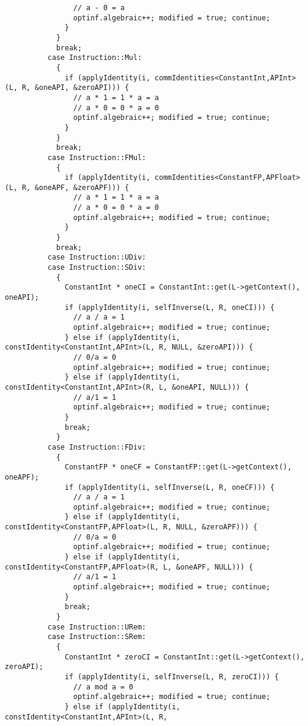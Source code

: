 \documentclass[12pt]{article}
\begin{document}
\begin{verbatim}
                // a - 0 = a
                optinf.algebraic++; modified = true; continue;
              }
            }
            break;
          case Instruction::Mul:
            {
              if (applyIdentity(i, commIdentities<ConstantInt,APInt>(L, R, &oneAPI, &zeroAPI))) {
                // a * 1 = 1 * a = a
                // a * 0 = 0 * a = 0
                optinf.algebraic++; modified = true; continue;
              }
            }
            break;
          case Instruction::FMul:
            {
              if (applyIdentity(i, commIdentities<ConstantFP,APFloat>(L, R, &oneAPF, &zeroAPF))) {
                // a * 1 = 1 * a = a
                // a * 0 = 0 * a = 0
                optinf.algebraic++; modified = true; continue;
              }
            }
            break;
          case Instruction::UDiv:
          case Instruction::SDiv:
            {
              ConstantInt * oneCI = ConstantInt::get(L->getContext(), oneAPI);
              if (applyIdentity(i, selfInverse(L, R, oneCI))) {
                // a / a = 1
                optinf.algebraic++; modified = true; continue;
              } else if (applyIdentity(i, constIdentity<ConstantInt,APInt>(L, R, NULL, &zeroAPI))) {
                // 0/a = 0
                optinf.algebraic++; modified = true; continue;
              } else if (applyIdentity(i, constIdentity<ConstantInt,APInt>(R, L, &oneAPI, NULL))) {
                // a/1 = 1
                optinf.algebraic++; modified = true; continue;
              }
              break;
            }
          case Instruction::FDiv:
            {
              ConstantFP * oneCF = ConstantFP::get(L->getContext(), oneAPF);
              if (applyIdentity(i, selfInverse(L, R, oneCF))) {
                // a / a = 1
                optinf.algebraic++; modified = true; continue;
              } else if (applyIdentity(i, constIdentity<ConstantFP,APFloat>(L, R, NULL, &zeroAPF))) {
                // 0/a = 0
                optinf.algebraic++; modified = true; continue;
              } else if (applyIdentity(i, constIdentity<ConstantFP,APFloat>(R, L, &oneAPF, NULL))) {
                // a/1 = 1
                optinf.algebraic++; modified = true; continue;
              }
              break;
            }
          case Instruction::URem:
          case Instruction::SRem:
            {
              ConstantInt * zeroCI = ConstantInt::get(L->getContext(), zeroAPI);
              if (applyIdentity(i, selfInverse(L, R, zeroCI))) {
                // a mod a = 0
                optinf.algebraic++; modified = true; continue;
              } else if (applyIdentity(i, constIdentity<ConstantInt,APInt>(L, R, 

\end{verbatim}
\end{document}
